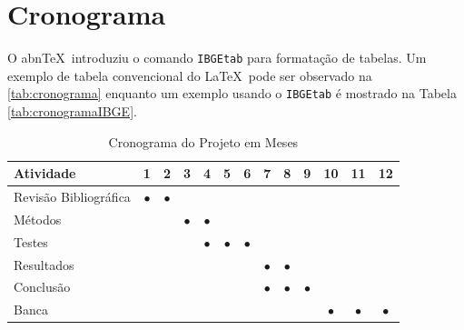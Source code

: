 \documentclass[
	12pt,				    %
	openright,			    %
	oneside,			    %
	a4paper,			    %
    sumario=tradicional,    %
	english,			    %
	brazil,				    %
	]{abntex2}
\begin{document}
\chapter{Cronograma}\label{sec:cronograma}
O abn\TeX\ introduziu o comando \texttt{IBGEtab} para formatação de tabelas. Um exemplo de tabela convencional do \LaTeX\ pode ser observado na \autoref{tab:cronograma} enquanto um exemplo usando o \texttt{IBGEtab} é mostrado na Tabela \ref{tab:cronogramaIBGE}.

\begin{table}[htbp]
  \centering
    \caption[Cronograma Normal]{Cronograma do Projeto em Meses}
    \label{tab:cronograma}
    \begin{tabular}{lcccccccccccc} %
    \toprule
    \textbf{Atividade} & \textbf{1} & \textbf{2} & \textbf{3} & \textbf{4} & \textbf{5} & \textbf{6} & \textbf{7} & \textbf{8} & \textbf{9} & \textbf{10} & \textbf{11} & \textbf{12} \\
    \midrule
        Revisão Bibliográfica & $\bullet$ & $\bullet$ & & & & & & & & & & \\
        Métodos & & & $\bullet$ & $\bullet$ & & & & & & & & \\
        Testes & & & & $\bullet$ & $\bullet$ & $\bullet$ & & & & & & \\
        Resultados & & & & & & & $\bullet$ & $\bullet$ & & & & \\
        Conclusão & & & & & & & $\bullet$ & $\bullet$ & $\bullet$ & & & \\
        Banca & & & & & & &&&& $\bullet$ & $\bullet$ & $\bullet$ \\
    \bottomrule
    \end{tabular}%
\end{table}%
\end{document}

